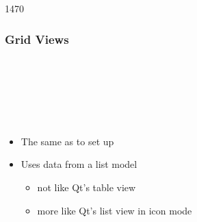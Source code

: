 \begin{slide}{1470}\frametitle{Grid Views}

\begin{qml}
\\
\\
\\
\\
\\
\qtt{\}}
\end{qml}

\begin{itemize}
\item The same as  to set up
\item Uses data from a list model
  \begin{itemize}
  \item not like Qt's table view
  \item more like Qt's list view in icon mode
  \end{itemize}
\end{itemize}

\end{slide}


